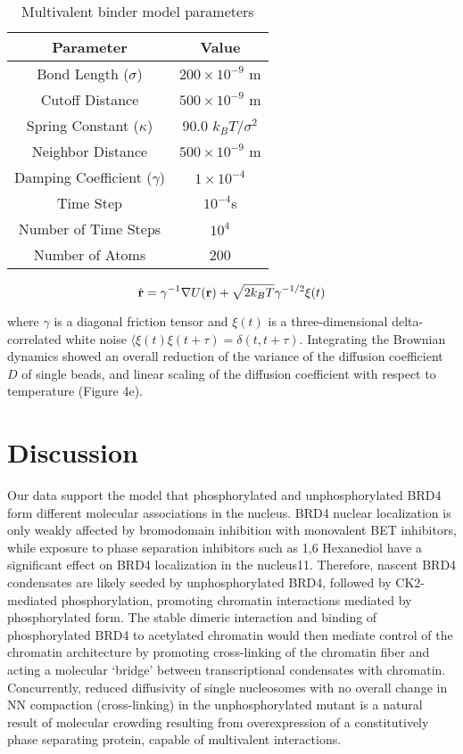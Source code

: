 \begin{table}[h!]
\centering
\begin{tabular}{|c|c|}
\hline
\textbf{Parameter} & \textbf{Value} \\ \hline
Bond Length ($\sigma$) & $200 \times 10^{-9}$ m \\ \hline
Cutoff Distance & $500 \times 10^{-9}$ m \\ \hline
Spring Constant ($\kappa$) & 90.0 $k_{B}T/\sigma^2$ \\ \hline
Neighbor Distance & $500 \times 10^{-9}$ m \\ \hline
Damping Coefficient ($\gamma$) & $1 \times 10^{-4}$ \\ \hline
Time Step & $10^{-4}$s\\ \hline
Number of Time Steps & $10^4$ \\ \hline
Number of Atoms & 200 \\ \hline
\end{tabular}
\caption{Multivalent binder model parameters}
\end{table}

\begin{equation*}
\dot{\bold{r}} = \gamma^{-1}\nabla U(\bold{r}) +\sqrt{2 k_{B}T}\gamma^{-1/2}\xi(t)
\end{equation*}

where $\gamma$ is a diagonal friction tensor and $\xi(t)$ is a three-dimensional delta-correlated white noise $\langle \xi(t)\xi(t+\tau)  = \delta(t,t+\tau)$. Integrating the Brownian dynamics showed an overall reduction of the variance of the diffusion coefficient $D$ of single beads, and linear scaling of the diffusion coefficient with respect to temperature (Figure 4e).

\section{Discussion}

Our data support the model that phosphorylated and unphosphorylated BRD4 form different molecular associations in the nucleus. BRD4 nuclear localization is only weakly affected by bromodomain inhibition with monovalent BET inhibitors, while exposure to phase separation inhibitors such as 1,6 Hexanediol have a significant effect on BRD4 localization in the nucleus11. Therefore, nascent BRD4 condensates are likely seeded by unphosphorylated BRD4, followed by CK2-mediated phosphorylation, promoting chromatin interactions mediated by phosphorylated form. The stable dimeric interaction and binding of phosphorylated BRD4 to acetylated chromatin would then mediate control of the chromatin architecture by promoting cross-linking of the chromatin fiber and acting a molecular ‘bridge’ between transcriptional condensates with chromatin. Concurrently, reduced diffusivity of single nucleosomes with no overall change in NN compaction (cross-linking) in the unphosphorylated mutant is a natural result of molecular crowding resulting from overexpression of a constitutively phase separating protein, capable of multivalent interactions. 

